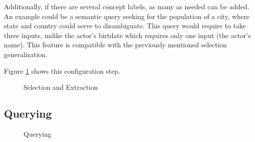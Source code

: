 \documentclass[runningheads]{llncs}
\begin{document}
Additionally, if there are several concept labels, as many as needed can be added. An example could be a semantic query seeking for the population of a city, where state and country could serve to disambiguate. This query would require to take three inputs, unlike the actor's birtdate which requires only one input (the actor's name). This feature is compatible with the previously mentioned selection generalization.

Figure \ref{fig-selectionExtraction} shows this configuration step.


\begin{figure}
  \centering
    \caption{Selection and Extraction}
    \label{fig-selectionExtraction}
\end{figure}



\subsection{Querying}

\begin{figure}
  \centering
    \caption{Querying}
    \label{fig-querying}
\end{figure}
\end{document}

